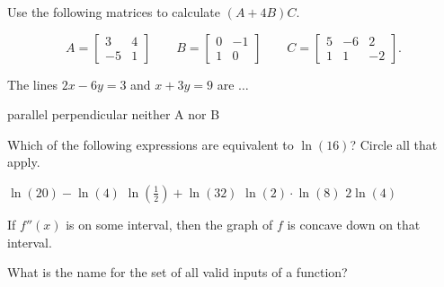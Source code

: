 \documentclass[11pt,addpoints]{exam}
\begin{document}
\begin{questions}



\question[4] Use the following matrices to calculate $(A+4B)C$.

\[
A = \left[\begin{matrix} 3 & 4 \\ -5 & 1 \end{matrix}\right] \qquad
B = \left[\begin{matrix} 0 & -1 \\ 1 & 0 \end{matrix}\right] \qquad
C = \left[\begin{matrix} 5 & -6 & 2 \\ 1 & 1 & -2 \end{matrix}\right].
\]




\newpage %

\question[3]
The lines $2x-6y=3$ and $x+3y=9$ are $\ldots$

\begin{choices}
\choice parallel
\choice perpendicular
\choice neither A nor B
\end{choices}




\question[3]
Which of the following expressions are equivalent to $\ln(16)$?  Circle all that apply.

\begin{oneparchoices}
\choice $\ln(20)-\ln(4)$
\choice $\ln(\frac{1}{2})+\ln(32)$
\choice $\ln(2)\cdot\ln(8)$
\choice $2\ln(4)$
\end{oneparchoices}




\question[2]
If $f''(x)$ is \fillin[negative][4cm] on some interval, then the graph of $f$ is concave down on that interval.




\question[2]
What is the name for the set of all valid inputs of a function?
\answerline





\end{questions}
\end{document}
